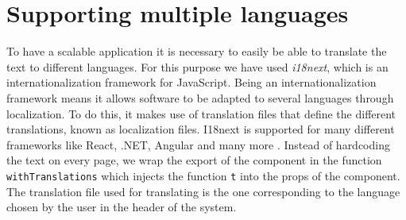 \section{Supporting multiple languages}
To have a scalable application it is necessary to easily be able to translate the text to different languages.
For this purpose we have used \textit{i18next}, which is an internationalization framework for JavaScript.
Being an internationalization framework means it allows software to be adapted to several languages through localization.
To do this, it makes use of translation files that define the different translations, known as localization files.
I18next is supported for many different frameworks like React, .NET, Angular and many more \cite{i18next}.
Instead of hardcoding the text on every page, we wrap the export of the component in the function \texttt{withTranslations} which injects the function \texttt{t} into the props of the component.
The translation file used for translating is the one corresponding to the language chosen by the user in the header of the system.  

